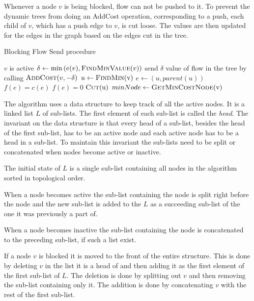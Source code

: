 Whenever a node $v$ is being blocked, flow can not be pushed to it. To prevent the dynamic trees from doing an AddCost operation, corresponding to a push, each 
child of $v$, which has a push edge to $v$, is cut loose. The values are then updated for the edges in the graph based on the edges cut in the tree.

\begin{algorithm}
\caption{Blocking Flow Send procedure}\label{BFSend}
\begin{algorithmic}[1]
\Statex
\Statex
\Require $v$ is active
		\State $\delta \gets \min{(e(v), \Call{FindMinValue}{v}})$
		\State send $\delta$ value of flow  in the tree by calling $\Call{AddCost}{v,-\delta}$
			\State $u \gets \Call{FindMin}{$v$} $
			\State $e \gets (u,parent(u))$
				\State $f(e) = c(e)$
			\Else
				\State $f(e) = 0$
			\EndIf
			\State $\Call{Cut}{$u$} $
		\EndWhile
	\EndWhile
\EndProcedure
\Statex
{}
	\State $minNode \gets \Call{GetMinCostNode}{$v$}$
	\State \Return {}
\EndFunction
\end{algorithmic}
\end{algorithm}
The algorithm uses a data structure to keep track of all the active nodes. It is a linked list $L$ of sub-lists. 
The first element of each sub-list is called the \emph{head}. 
The invariant on the data structure is that every head of a sub-list, besides the head of the first sub-list, 
has to be an active node and each active node has to be a head in a sub-list. 
To maintain this invariant the sub-lists need to be split or concatenated when nodes become active or inactive. 

The initial state of $L$ is a single sub-list containing all nodes in the algorithm sorted in topological order. 

When a node becomes active the sub-list containing the node is split right before the node and the new sub-list is added to the $L$ as a
succeeding sub-list of the one it was previously a part of. 

When a node becomes inactive the sub-list containing the node is concatenated to the preceding sub-list, if such a list exist. 

If a node $v$ is blocked it is moved to the front of the entire structure. This is done by deleting $v$ in the list it is a head of and
then adding it as the first element of the first sub-list of $L$. The deletion is done by splitting out $v$ and then removing the sub-list containing 
only it. The addition is done by concatenating $v$ with the rest of the first sub-list.

